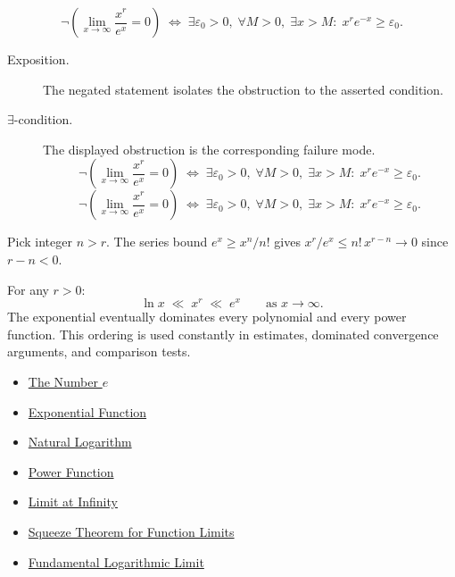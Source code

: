 \begin{remark*}
\[
\neg\left(\lim_{x\to\infty}\frac{x^r}{e^x}=0\right)
  \;\iff\;
  \exists\varepsilon_0>0,\;\forall M>0,\;\exists x>M:\;
  x^r e^{-x} \geq \varepsilon_0.
\]
\end{remark*}

\begin{remark*}
\begin{description}
  \item[Exposition.]
  The negated statement isolates the obstruction to the asserted condition.

  \item[\(\exists\)-condition.]
  The displayed obstruction is the corresponding failure mode.
  \[
\neg\left(\lim_{x\to\infty}\frac{x^r}{e^x}=0\right)
  \;\iff\;
  \exists\varepsilon_0>0,\;\forall M>0,\;\exists x>M:\;
  x^r e^{-x} \geq \varepsilon_0.
  \]
  \[
\neg\left(\lim_{x\to\infty}\frac{x^r}{e^x}=0\right)
  \;\iff\;
  \exists\varepsilon_0>0,\;\forall M>0,\;\exists x>M:\;
  x^r e^{-x} \geq \varepsilon_0.
  \]
\end{description}
\end{remark*}



\begin{remark*}[Interpretation]
Pick integer $n > r$. The series bound $e^x \geq x^n/n!$ gives
$x^r/e^x \leq n!\, x^{r-n} \to 0$ since $r - n < 0$.


For any $r > 0$:
\[
  \ln x \;\ll\; x^r \;\ll\; e^x
  \qquad \text{as } x \to \infty.
\]
The exponential eventually dominates every polynomial and every
power function. This ordering is used constantly in estimates,
dominated convergence arguments, and comparison tests.
\end{remark*}

\begin{dependencies}
\begin{itemize}
  \item \hyperref[def:number-e]{The Number $e$}
  \item \hyperref[def:exponential]{Exponential Function}
  \item \hyperref[def:natural-logarithm]{Natural Logarithm}
  \item \hyperref[def:power-function]{Power Function}
  \item \hyperref[def:limit-at-infinity]{Limit at Infinity}
  \item \hyperref[thm:squeeze-function-limits]{Squeeze Theorem for Function Limits}
  \item \hyperref[prop:limit-logarithm-fundamental]{Fundamental Logarithmic Limit}
\end{itemize}
\end{dependencies}
